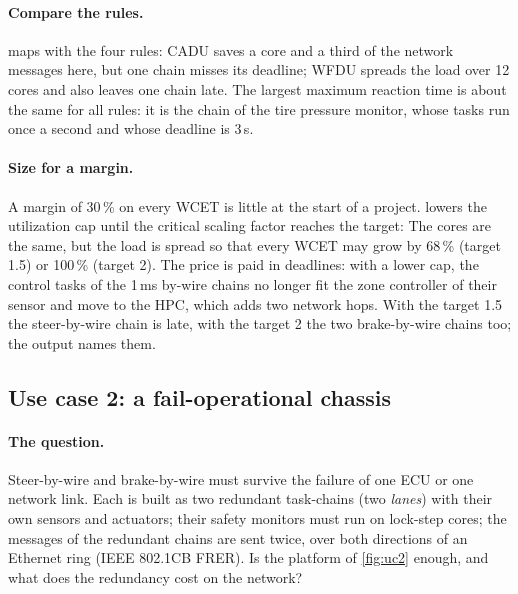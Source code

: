 \paragraph{Compare the rules.}  maps with the four
rules:
CADU saves a core and a third of the network messages here, but one chain
misses its deadline; WFDU spreads the load over 12 cores and also leaves
one chain late. The largest maximum reaction time is about the same for
all rules: it is the chain of the tire pressure monitor, whose tasks run
once a second and whose deadline is 3\,s.

\paragraph{Size for a margin.} A margin of 30\,\% on every WCET is
little at the start of a project.  lowers the
utilization cap until the critical scaling factor reaches the target:
The cores are the same, but the load is spread so that every WCET may
grow by 68\,\% (target 1.5) or 100\,\% (target 2). The price is paid in
deadlines: with a lower cap, the control tasks of the 1\,ms by-wire chains
no longer fit the zone controller of their sensor and move to the HPC,
which adds two network hops. With the target 1.5 the steer-by-wire chain
is late, with the target 2 the two brake-by-wire chains too; the
 output names them.

\subsection{Use case 2: a fail-operational chassis}
\label{sec:uc2}

\paragraph{The question.} Steer-by-wire and brake-by-wire must survive
the failure of one ECU or one network link. Each is built as two
redundant task-chains (two \emph{lanes}) with their own sensors and
actuators; their safety monitors must run on lock-step cores; the
messages of the redundant chains are sent twice, over both directions of
an Ethernet ring (IEEE 802.1CB FRER). Is the platform of \cref{fig:uc2}
enough, and what does the redundancy cost on the network?

